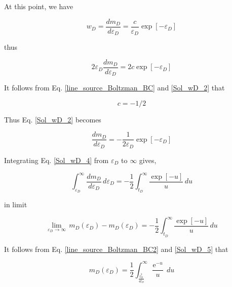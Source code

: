 \documentclass{llncs}
\numberwithin{equation}{section}
\numberwithin{figure}{section}
\numberwithin{table}{section}
\begin{document}
    At this point, we have

    \begin{equation*}
        {{w}_{D}}=\frac{d{{m}_{D}}}{d{{\varepsilon }_{D}}}=\frac{c}{{{\varepsilon }_{D}}}\exp \left[ -{{\varepsilon }_{D}} \right]
    \end{equation*}

    thus

    \begin{equation}
        2{{\varepsilon }_{D}}\frac{d{{m}_{D}}}{d{{\varepsilon }_{D}}}=2c\exp \left[ -{{\varepsilon }_{D}} \right]
        \label{Sol_wD_2}
    \end{equation}

    It follows from Eq. \ref{line_source_Boltzman_BC} and \ref{Sol_wD_2} that

    \begin{equation}
        c=-1/2
        \label{Sol_wD_3}
    \end{equation}

    Thus Eq. \ref{Sol_wD_2} becomes

    \begin{equation}
        \frac{d{{m}_{D}}}{d{{\varepsilon }_{D}}}=-\frac{1}{2{{\varepsilon }_{D}}}\exp \left[ -{{\varepsilon }_{D}} \right]
        \label{Sol_wD_4}
    \end{equation}

    Integrating Eq. \ref{Sol_wD_4} from ${\varepsilon }_{D}$ to $\infty$ gives,

    \begin{equation*}
       \int_{{{\varepsilon }_{D}}}^{\infty }{\frac{d{{m}_{D}}}{d{{\varepsilon }_{D}}}}\,d{{\varepsilon }_{D}}=-\frac{1}{2}\int_{{{t}_{D}}}^{\infty }{\frac{\exp \left[ -u \right]}{u}}\,du
    \end{equation*}

    in limit

    \begin{equation}
        \underset{{{\varepsilon }_{D}}\to \infty }{\mathop{\lim }}\,{{m}_{D}}\left( {{\varepsilon }_{D}} \right)-{{m}_{D}}\left( {{\varepsilon }_{D}} \right)=-\frac{1}{2}\int_{{{t}_{D}}}^{\infty }{\frac{\exp \left[ -u \right]}{u}}\,du
        \label{Sol_wD_5}
    \end{equation}

    It follows from Eq. \ref{line_source_Boltzman_BC2} and \ref{Sol_wD_5} that

    \begin{equation}
       {{  m }_{D}}\left( {{\varepsilon }_{D}} \right)=\frac{1}{2}\int_{\frac{t_{D}^{2}}{4{{t}_{D}}}}^{\infty }{\frac{{{\operatorname{e}}^{-u}}}{u}}\,du
        \label{Theis_Solution}
    \end{equation}
\end{document}
